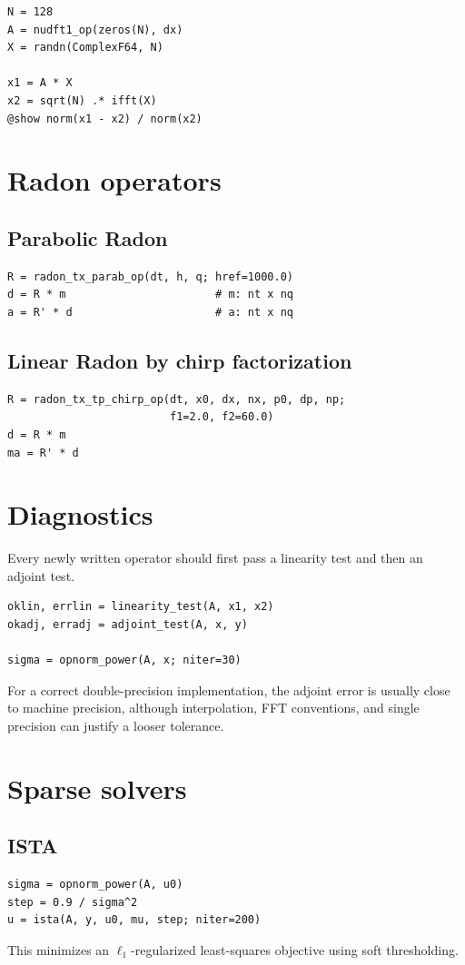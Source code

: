 \documentclass[11pt]{article}
\begin{document}
\begin{verbatim}
N = 128
A = nudft1_op(zeros(N), dx)
X = randn(ComplexF64, N)

x1 = A * X
x2 = sqrt(N) .* ifft(X)
@show norm(x1 - x2) / norm(x2)
\end{verbatim}

\section{Radon operators}
\subsection{Parabolic Radon}
\begin{verbatim}
R = radon_tx_parab_op(dt, h, q; href=1000.0)
d = R * m                       # m: nt x nq
a = R' * d                      # a: nt x nq
\end{verbatim}

\subsection{Linear Radon by chirp factorization}
\begin{verbatim}
R = radon_tx_tp_chirp_op(dt, x0, dx, nx, p0, dp, np;
                         f1=2.0, f2=60.0)
d = R * m
ma = R' * d
\end{verbatim}

\section{Diagnostics}
Every newly written operator should first pass a linearity test and then an
adjoint test.
\begin{verbatim}
oklin, errlin = linearity_test(A, x1, x2)
okadj, erradj = adjoint_test(A, x, y)

sigma = opnorm_power(A, x; niter=30)
\end{verbatim}
For a correct double-precision implementation, the adjoint error is usually
close to machine precision, although interpolation, FFT conventions, and
single precision can justify a looser tolerance.

\section{Sparse solvers}
\subsection{ISTA}
\begin{verbatim}
sigma = opnorm_power(A, u0)
step = 0.9 / sigma^2
u = ista(A, y, u0, mu, step; niter=200)
\end{verbatim}
This minimizes an $\ell_1$-regularized least-squares objective using soft
thresholding.
\end{document}
